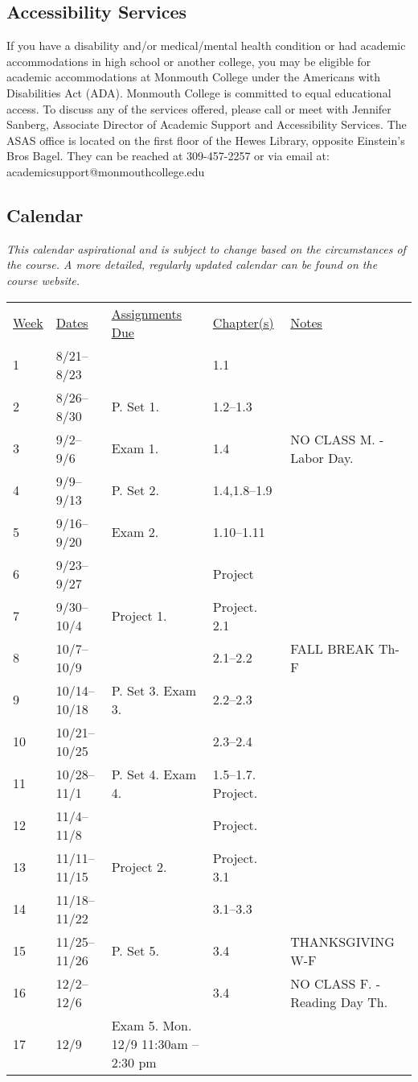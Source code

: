 \documentclass[10pt]{article}
\begin{document}
\subsection*{Accessibility Services}
If you have a disability and/or medical/mental health condition or had academic accommodations in high school or another college, you may be eligible for academic accommodations at Monmouth College under the Americans with Disabilities Act (ADA). Monmouth College is committed to equal educational access. To discuss any of the services offered, please call or meet with Jennifer Sanberg, Associate Director of Academic Support and Accessibility Services. The ASAS office is located on the first floor of the Hewes Library, opposite Einstein’s Bros Bagel. They can be reached at 309-457-2257 or via email at: academicsupport@monmouthcollege.edu


\subsection{Calendar}

\textit{This calendar aspirational and is subject to change based on the circumstances of the course. A more detailed, regularly updated calendar can be found on the course website. }


\begin{center}
\begin{tabular}{lllll}
\underline{Week} & \underline{Dates} & \underline{Assignments Due} & \underline{Chapter(s)} & \underline{Notes} \\
1 & 8/21--8/23  &  & 1.1 & \\
2 & 8/26--8/30 & P. Set 1. & 1.2--1.3 & \\
3 & 9/2--9/6 & Exam 1. & 1.4 & NO CLASS M. - Labor Day. \\
4 & 9/9--9/13  & P. Set 2. & 1.4,1.8--1.9 &  \\
5 & 9/16--9/20 & Exam 2. & 1.10--1.11 & \\
6 & 9/23--9/27 &  & Project & \\
7 & 9/30--10/4 & Project 1. & Project. 2.1  & \\
8 & 10/7--10/9 & & 2.1--2.2 & FALL BREAK Th-F  \\
9 & 10/14--10/18 & P. Set 3. Exam 3. & 2.2--2.3 &  \\
10 & 10/21--10/25  & & 2.3--2.4 & \\
11 & 10/28--11/1 & P. Set 4. Exam 4. & 1.5--1.7. Project. & \\
12 & 11/4--11/8 &  & Project. & \\
13 & 11/11--11/15 & Project 2. & Project. 3.1 & \\
14 & 11/18--11/22 &  & 3.1--3.3 & \\
15 & 11/25--11/26 & P. Set 5. & 3.4 & THANKSGIVING W-F \\
16 & 12/2--12/6 & & 3.4 & NO CLASS F. - Reading Day Th.\\
17 & 12/9 & Exam 5. Mon. 12/9 11:30am -- 2:30 pm & &  \\
\end{tabular}
\end{center}
\end{document}
